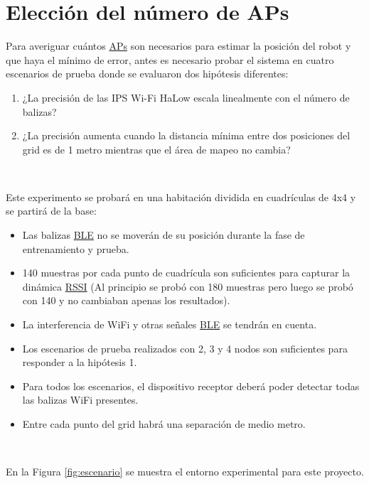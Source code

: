 \section{Elección del número de APs}
\label{sec:num_aps}

Para averiguar cuántos \hyperlink{APs}{APs} son necesarios para estimar la posición del robot y que haya el mínimo de error, antes es necesario probar el sistema en cuatro escenarios de prueba donde se evaluaron dos hipótesis diferentes:

\begin{enumerate}
 \item \textit{} ¿La precisión de las IPS Wi-Fi HaLow escala linealmente con el número de balizas?
 \item \textit{} ¿La precisión aumenta cuando la distancia mínima entre dos posiciones del grid es de 1 metro mientras que el área de mapeo no cambia?
\end{enumerate}\


Este experimento se probará en una habitación dividida en cuadrículas de 4x4 y se partirá de la base:

\begin{itemize}
\item \textit{} Las balizas \hyperlink{BLE}{BLE}  no se moverán de su posición durante la fase de entrenamiento y prueba.
 \item \textit{} 140 muestras por cada punto de cuadrícula son suficientes para capturar la dinámica \hyperlink{RSSI}{RSSI} (Al principio se probó con 180 muestras pero luego se probó con 140 y no cambiaban apenas los resultados).
 \item \textit{} La interferencia de WiFi y otras señales \hyperlink{BLE}{BLE}  se tendrán en cuenta.
 \item \textit{} Los escenarios de prueba realizados con 2, 3 y 4 nodos son suficientes para responder a la hipótesis 1.
 \item \textit{} Para todos los escenarios, el dispositivo receptor deberá poder detectar todas las balizas WiFi presentes.
 \item \textit{} Entre cada punto del grid habrá una separación de medio metro.
\end{itemize}\


En la Figura \ref{fig:escenario} se muestra el entorno experimental para este proyecto.

